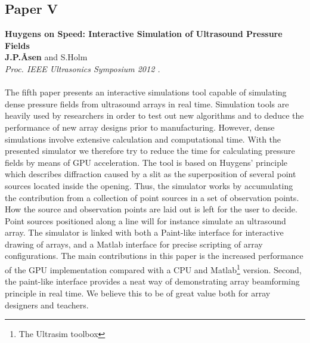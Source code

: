 \subsection{Paper V}
\textbf{Huygens on Speed: Interactive Simulation of Ultrasound Pressure Fields}\\
\textbf{J.\:P.\:\AA{}sen} and S.\:Holm\\
{\it Proc. IEEE Ultrasonics Symposium 2012 .}\\\\
The fifth paper presents an interactive simulations tool capable of simulating dense pressure fields from ultrasound arrays in real time. Simulation tools are heavily used by researchers in order to test out new algorithms and to deduce the performance of new array designs prior to manufacturing. However, dense simulations involve extensive calculation and computational time. With the presented simulator we therefore try to reduce the time for calculating pressure fields by means of GPU acceleration. The tool is based on Huygens' principle which describes diffraction caused by a slit as the superposition of several point sources located inside the opening. Thus, the simulator works by accumulating the contribution from a collection of point sources in a set of observation points. How the source and observation points are laid out is left for the user to decide. Point sources positioned along a line will for instance simulate an ultrasound array. The simulator is linked with both a Paint-like interface for interactive drawing of arrays, and a Matlab interface for precise scripting of array configurations. The main contributions in this paper is the increased performance of the GPU implementation compared with a CPU and Matlab\footnote{The Ultrasim toolbox } version. Second, the paint-like interface provides a neat way of demonstrating array beamforming principle in real time. We believe this to be of great value both for array designers and teachers.


